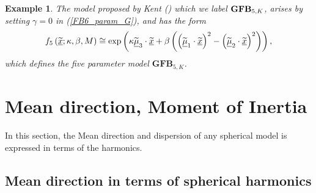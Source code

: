 \documentclass[preprint,11pt,a4paper]{elsarticle}
\newtheorem{example}[theorem]{Example}
\begin{document}
\begin{comment}%

See Appendix \ref{Appendix_Proofs_DW} for the proof.

\end{comment}%

\begin{example}
The model proposed by Kent (\cite{kent1982fisher}) which we label $\mathbf{%
GFB}_{5,K}$, arises by setting $\gamma=0$ in (\ref{FB6_param_G}), and has
the form 
\begin{equation}
f_{5}\left( \underline{\widetilde{x}};\kappa,\beta,M\right) \cong\exp\left(
\kappa\widetilde{\underline{\mu}}_{3}\cdot\underline{\widetilde{x}}%
+\beta\left( \left( \widetilde{\underline{\mu}}_{1}\cdot \underline{%
\widetilde{x}}\right) ^{2}-\left( \widetilde{\underline{\mu}}_{2}\cdot%
\underline{\widetilde{x}}\right) ^{2}\right) \right) ,  \label{Density_FB5}
\end{equation}
which defines the five parameter model $\mathbf{GFB}_{5,K}$.
\end{example}

\section{Mean direction, Moment of Inertia}

In this section, the Mean direction and dispersion of any spherical model is
expressed in terms of the harmonics.

\subsection{Mean direction in terms of spherical harmonics}
\end{document}
